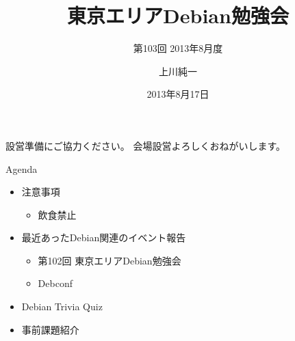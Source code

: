 \title{東京エリアDebian勉強会}
\subtitle{第103回 2013年8月度}
\author{上川純一}
\date{2013年8月17日}



\begin{frame}
\titlepage{}
\end{frame}

\begin{frame}{設営準備にご協力ください。}
会場設営よろしくおねがいします。
\end{frame}

\begin{frame}{Agenda}
\begin{minipage}[t]{0.45\hsize}
  \begin{itemize}
  \item 注意事項
	\begin{itemize}
	 \item 飲食禁止
	\end{itemize}
   \item 最近あったDebian関連のイベント報告
	\begin{itemize}
        \item 第102回 東京エリアDebian勉強会
        \item Debconf
	\end{itemize}
 \end{itemize}
\end{minipage} 
\begin{minipage}[t]{0.45\hsize}
 \begin{itemize}
  \item Debian Trivia Quiz
  \item 事前課題紹介
 \end{itemize}
\end{minipage}
\end{frame}

